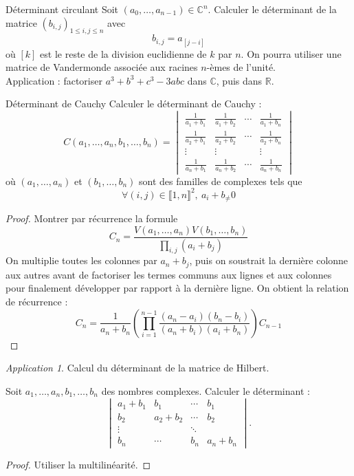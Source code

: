 \documentclass[french,a4paper]{article}
\newcommand{\R}{\mathbb{R}}
\newcommand{\C}{\mathbb{C}}
\theoremstyle{plain}
\theoremstyle{definition}
\theoremstyle{remark}
\newtheorem*{app}{Application}
\begin{document}
\begin{ex}{Déterminant circulant}
	Soit $(a_0,\ldots,a_{n-1})\in\C^n$. Calculer le déterminant de la matrice $(b_{i,j})_{1\leqslant i,j\leqslant n}$ avec $$b_{i,j}=a_{[j-i]}$$ où $[k]$ est le reste de la division euclidienne de $k$ par $n$. On pourra utiliser une matrice de Vandermonde associée aux racines $n$-èmes de l'unité. \\
	Application : factoriser $a^3+b^3+c^3-3abc$ dans $\C$, puis dans $\R$.
\end{ex}

\begin{ex}{Déterminant de Cauchy}
	Calculer le déterminant de Cauchy : $$C(a_1,\ldots,a_n,b_1,\ldots,b_n)=\displaystyle\begin{vmatrix}
		\displaystyle\frac{1}{a_1+b_1}&\displaystyle\frac{1}{a_1+b_2}&\cdots&\displaystyle\frac{1}{a_1+b_n}\\
		\displaystyle\frac{1}{a_2+b_1}&\displaystyle\frac{1}{a_2+b_2}&\cdots&\displaystyle\frac{1}{a_2+b_n}\\
		\vdots&\vdots&&\vdots\\
		\displaystyle\frac{1}{a_n+b_1}&\displaystyle\frac{1}{a_n+b_2}&\cdots&\displaystyle\frac{1}{a_n+b_n}
	\end{vmatrix}$$ où $(a_1,\ldots,a_n)$ et $(b_1,\ldots,b_n)$ sont des familles de complexes tels que $$\forall (i,j)\in\llbracket1,n\rrbracket^2,\ a_i+b_\ne 0$$
\end{ex}
\begin{proof}
	Montrer par récurrence la formule $$C_n=\frac{V(a_1,\ldots,a_n)V(b_1,\ldots,b_n)}{\prod_{i,j}(a_i+b_j)}$$On multiplie toutes les colonnes par $a_n+b_j$, puis on soustrait la dernière colonne aux autres avant de factoriser les termes communs aux lignes et aux colonnes pour finalement développer par rapport à la dernière ligne. On obtient la relation de récurrence : $$C_n=\frac{1}{a_n+b_n}\left(\prod_{i=1}^{n-1}\frac{(a_n-a_i)(b_n-b_i)}{(a_n+b_i)(a_i+b_n)}\right)C_{n-1}$$
\end{proof}
\begin{app}
	Calcul du déterminant de la matrice de Hilbert.
\end{app}

\begin{ex}{}
	Soit $a_1,\ldots,a_n,b_1,\ldots,b_n$ des nombres complexes. Calculer le déterminant : $$\begin{vmatrix}
		a_1+b_1&b_1&\cdots&b_1\\
		b_2&a_2+b_2&\cdots&b_2\\
		\vdots&&\ddots&\\
		b_n&\cdots&b_n&a_n+b_n
	\end{vmatrix}.$$
\end{ex}
\begin{proof}
	Utiliser la multilinéarité.
\end{proof}
\end{document}
